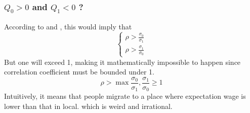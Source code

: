 \subsubsection{$Q_0>0$ and $Q_1<0$ ?}\label{sec:imposible_case}

According to  and , this would imply that
$$
\begin{cases}
    \rho>\frac{\sigma_0}{\sigma_1}\\
    \rho>\frac{\sigma_1}{\sigma_0}
\end{cases}
$$
But one will exceed 1, making it mathematically impossible to happen since correlation coefficient must be bounded under 1.
\begin{equation*}
    \rho > \max{\frac{\sigma_0}{\sigma_1},\frac{\sigma_1}{\sigma_0}} \ge 1
\end{equation*}
Intuitively, it means that people migrate to a place where expectation wage is lower than that in local.
which is weird and irrational.